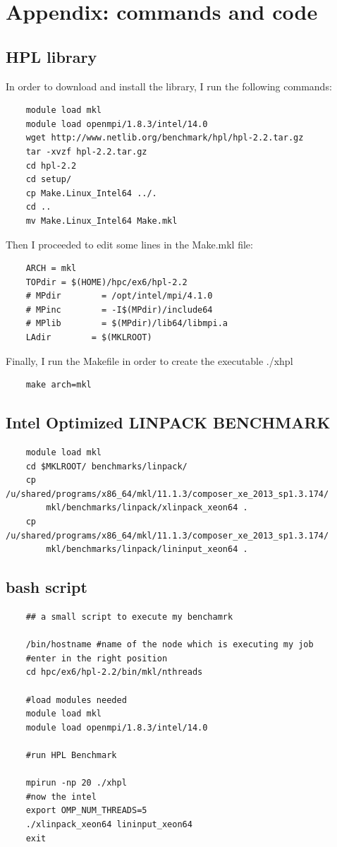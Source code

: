 \documentclass[10pt,a4paper]{article}
\begin{document}
\section{Appendix: commands and code}

\subsection{HPL library}

In order to download and install the library, I run the following commands:

\vspace{1mm} %
\begin{lstlisting}
	module load mkl
	module load openmpi/1.8.3/intel/14.0
	wget http://www.netlib.org/benchmark/hpl/hpl-2.2.tar.gz
	tar -xvzf hpl-2.2.tar.gz
	cd hpl-2.2
	cd setup/
	cp Make.Linux_Intel64 ../.
	cd ..
	mv Make.Linux_Intel64 Make.mkl
\end{lstlisting}


Then I proceeded to edit some lines in the Make.mkl file:

\vspace{1mm} %
\begin{lstlisting}
	ARCH = mkl
	TOPdir = $(HOME)/hpc/ex6/hpl-2.2
	# MPdir        = /opt/intel/mpi/4.1.0
	# MPinc        = -I$(MPdir)/include64
	# MPlib        = $(MPdir)/lib64/libmpi.a
	LAdir        = $(MKLROOT)
\end{lstlisting}

Finally, I run the Makefile in order to create the executable ./xhpl
\vspace{1mm} %
\begin{lstlisting}
	make arch=mkl
\end{lstlisting}

\subsection{Intel Optimized LINPACK BENCHMARK}
\begin{lstlisting}
	module load mkl
	cd $MKLROOT/ benchmarks/linpack/
	cp /u/shared/programs/x86_64/mkl/11.1.3/composer_xe_2013_sp1.3.174/
		mkl/benchmarks/linpack/xlinpack_xeon64 .
	cp /u/shared/programs/x86_64/mkl/11.1.3/composer_xe_2013_sp1.3.174/
		mkl/benchmarks/linpack/lininput_xeon64 .
\end{lstlisting} 

\subsection{bash script}
\begin{lstlisting}
	## a small script to execute my benchamrk
	
	/bin/hostname #name of the node which is executing my job
	#enter in the right position
	cd hpc/ex6/hpl-2.2/bin/mkl/nthreads
	
	#load modules needed
	module load mkl
	module load openmpi/1.8.3/intel/14.0
	
	#run HPL Benchmark
	
	mpirun -np 20 ./xhpl
	#now the intel
	export OMP_NUM_THREADS=5
	./xlinpack_xeon64 lininput_xeon64
	exit
\end{lstlisting} 
	
\end{document}
